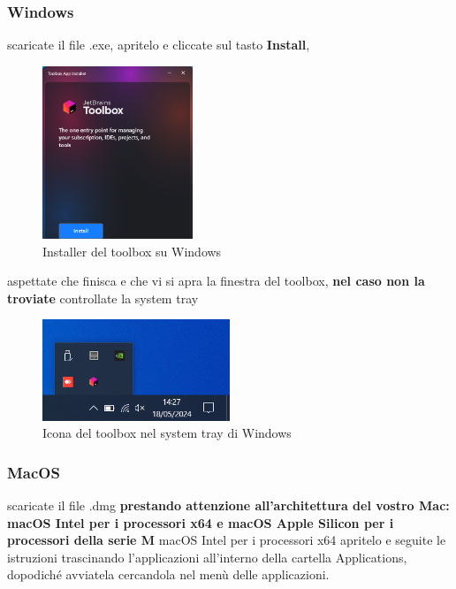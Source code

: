         \subsubsection{Windows}
            scaricate il file .exe, apritelo e cliccate sul tasto \textbf{Install},
            \begin{figure}[H]
                \centering
                \graphicspath{{src/capitoli/04/img/}}
                \includegraphics[width=0.4\textwidth]{toolbox-windows.png}
                \caption{Installer del toolbox su Windows}
                \label{fig:Installer del toolbox su Windows}
            \end{figure}
            aspettate che finisca e che vi si apra la finestra del toolbox, \textbf{nel caso non la troviate} 
            controllate la system tray
            \begin{figure}[H]
                \centering
                \graphicspath{{src/capitoli/04/img/}}
                \includegraphics[width=0.5\textwidth]{toolbox-tray-windows.png}
                \caption{Icona del toolbox nel system tray di Windows}
                \label{fig:Icona del toolbox nel system tray di Windows}
            \end{figure}

        \subsubsection{MacOS}
            scaricate il file .dmg \textbf{prestando attenzione all'architettura del vostro Mac: macOS Intel per i processori x64 e macOS Apple 
            Silicon per i processori della serie M} macOS Intel per i processori x64 apritelo e seguite le istruzioni trascinando l'applicazioni 
            all'interno della cartella Applications, dopodiché avviatela cercandola nel menù delle applicazioni.\clearpage

